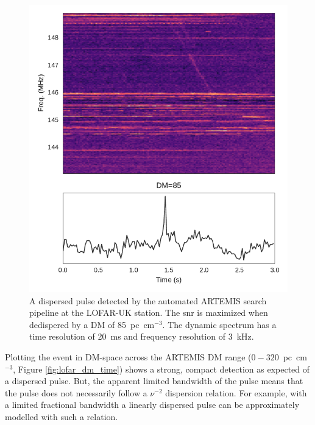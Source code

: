 \documentclass[a4paper,fleqn,usenatbib]{mnras}
\begin{document}
\begin{figure}
    \includegraphics[width=1.0\linewidth]{figures/LOFAR_dynamic.pdf}
    \caption{A dispersed pulse detected by the automated ARTEMIS search pipeline
    at the LOFAR-UK station. The \gls{snr} is maximized when dedispered by a DM
    of 85~pc~cm$^{-3}$. The dynamic spectrum has a time resolution of 20~ms and
    frequency resolution of 3~kHz.
    }
    \label{fig:lofar_dynamic}
\end{figure}

Plotting the event in DM-space across the ARTEMIS DM range
($0-320$~pc~cm$^{-3}$, Figure \ref{fig:lofar_dm_time}) shows a strong, compact
detection as expected of a dispersed pulse. But, the apparent limited bandwidth
of the pulse means that the pulse does not necessarily follow a $\nu^{-2}$
dispersion relation. For example, with a limited fractional bandwidth a linearly
dispersed pulse can be approximately modelled with such a relation.
\end{document}
